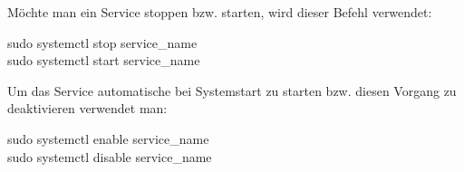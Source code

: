 Möchte man ein Service stoppen bzw. starten, wird dieser Befehl verwendet:
\begin{Textfeld1}
	sudo systemctl stop service\_name \\
	sudo systemctl start service\_name
\end{Textfeld1}

Um das Service automatische bei Systemstart zu starten bzw. diesen Vorgang zu deaktivieren verwendet man:
\begin{Textfeld1}
	sudo systemctl enable service\_name \\
	sudo systemctl disable service\_name
\end{Textfeld1}

